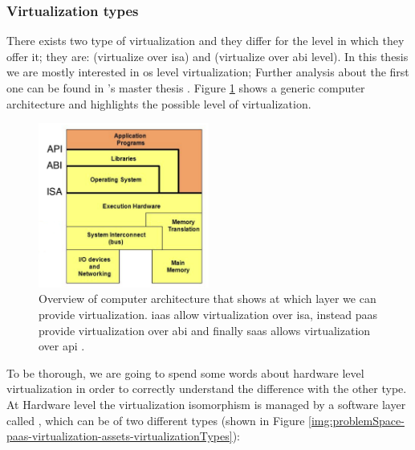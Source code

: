 \subsubsection{Virtualization types}
\label{sec:problemSpace-paas-virtualization-types}
There exists two type of virtualization and they differ for the level in which they offer it; they
are:  (virtualize over \ac{isa}) and  (virtualize over \ac{abi} level). In this thesis we are mostly interested in \acs{os}
level virtualization; Further analysis about the first one can be found in \citeauthor{gardimanThesis}'s
master thesis \cite{gardimanThesis}.
Figure \ref{img:problemSpace-paas-virtualization-assets-virtualizationLevels}
shows a generic computer architecture and highlights the possible level of virtualization.

\begin{figure}
	\centering{}
	\includegraphics[width=0.5\textwidth]{chapters/problem/images/computing-virtualization.png}
	\caption[Different computing virtualization levels]{Overview of computer architecture that shows at
		which layer we can provide virtualization. \acf{iaas} allow virtualization over \acf{isa}, instead
		\ac{paas} provide virtualization over \acf{abi} and finally \ac{saas} allows virtualization over
		\ac{api} \cite{virtualizationLevel}.}
	\label{img:problemSpace-paas-virtualization-assets-virtualizationLevels}
\end{figure}

To be thorough, we are going to spend some words about hardware level virtualization in order to correctly
understand the difference with the other type. At Hardware level the virtualization isomorphism is managed
by a software layer called , which can be of two different types (shown in Figure 
\ref{img:problemSpace-paas-virtualization-assets-virtualizationTypes}):

